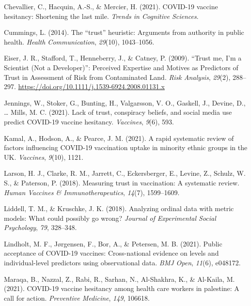 \documentclass[
  english,
  ,jou,floatsintext]{apa6}
\newlength{\cslhangindent}
\newlength{\cslentryspacingunit} %
\newenvironment{CSLReferences}[2] %
 {%
  \setlength{\parindent}{0pt}
  \ifodd #1
  \let\oldpar\par
  \def\par{\hangindent=\cslhangindent\oldpar}
  \fi
  \setlength{\parskip}{#2\cslentryspacingunit}
 }%
 {}
\begin{document}
\begin{CSLReferences}{1}{0}
\leavevmode{}%
Chevallier, C., Hacquin, A.-S., \& Mercier, H. (2021). COVID-19 vaccine hesitancy: Shortening the last mile. \emph{Trends in Cognitive Sciences}.

\leavevmode{}%
Cummings, L. (2014). The {``trust''} heuristic: Arguments from authority in public health. \emph{Health Communication}, \emph{29}(10), 1043--1056.

\leavevmode{}%
Eiser, J. R., Stafford, T., Henneberry, J., \& Catney, P. (2009). {``{Trust} me, {I}'m a {Scientist} ({Not} a {Developer})''}: {Perceived} {Expertise} and {Motives} as {Predictors} of {Trust} in {Assessment} of {Risk} from {Contaminated} {Land}. \emph{Risk Analysis}, \emph{29}(2), 288--297. \url{https://doi.org/10.1111/j.1539-6924.2008.01131.x}

\leavevmode{}%
Jennings, W., Stoker, G., Bunting, H., Valgarsson, V. O., Gaskell, J., Devine, D., \ldots{} Mills, M. C. (2021). Lack of trust, conspiracy beliefs, and social media use predict COVID-19 vaccine hesitancy. \emph{Vaccines}, \emph{9}(6), 593.

\leavevmode{}%
Kamal, A., Hodson, A., \& Pearce, J. M. (2021). A rapid systematic review of factors influencing COVID-19 vaccination uptake in minority ethnic groups in the UK. \emph{Vaccines}, \emph{9}(10), 1121.

\leavevmode{}%
Larson, H. J., Clarke, R. M., Jarrett, C., Eckersberger, E., Levine, Z., Schulz, W. S., \& Paterson, P. (2018). Measuring trust in vaccination: A systematic review. \emph{Human Vaccines \& Immunotherapeutics}, \emph{14}(7), 1599--1609.

\leavevmode{}%
Liddell, T. M., \& Kruschke, J. K. (2018). Analyzing ordinal data with metric models: What could possibly go wrong? \emph{Journal of Experimental Social Psychology}, \emph{79}, 328--348.

\leavevmode{}%
Lindholt, M. F., Jørgensen, F., Bor, A., \& Petersen, M. B. (2021). Public acceptance of COVID-19 vaccines: Cross-national evidence on levels and individual-level predictors using observational data. \emph{BMJ Open}, \emph{11}(6), e048172.

\leavevmode{}%
Maraqa, B., Nazzal, Z., Rabi, R., Sarhan, N., Al-Shakhra, K., \& Al-Kaila, M. (2021). COVID-19 vaccine hesitancy among health care workers in palestine: A call for action. \emph{Preventive Medicine}, \emph{149}, 106618.


\end{CSLReferences}
\end{document}
